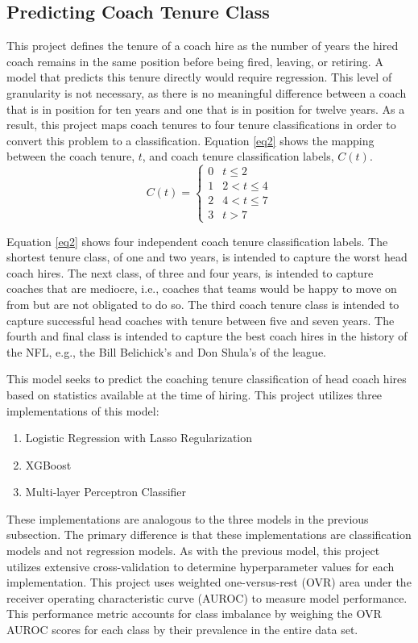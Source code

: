\documentclass[conference]{IEEEtran}
\begin{document}
\subsection{Predicting Coach Tenure Class}
This project defines the tenure of a coach hire as the number of years the hired coach remains in the same position before being fired, leaving, or retiring. A model that predicts this tenure directly would require regression. This level of granularity is not necessary, as there is no meaningful difference between a coach that is in position for ten years and one that is in position for twelve years. As a result, this project maps coach tenures to four tenure classifications in order to convert this problem to a classification. Equation \eqref{eq2} shows the mapping between the coach tenure, $t$, and coach tenure classification labels, $C(t)$.
\begin{equation}
        C(t)=
        \begin{cases}
            0 &t \leq 2 		\\
            1 &2 < t \leq 4 \\
            2 &4 < t \leq 7 \\
            3 &t > 7
        \end{cases}
        \label{eq2}
\end{equation}

Equation \eqref{eq2} shows four independent coach tenure classification labels. The shortest tenure class, of one and two years, is intended to capture the worst head coach hires. The next class, of three and four years, is intended to capture coaches that are mediocre, i.e., coaches that teams would be happy to move on from but are not obligated to do so. The third coach tenure class is intended to capture successful head coaches with tenure between five and seven years. The fourth and final class is intended to capture the best coach hires in the history of the NFL, e.g., the Bill Belichick's and Don Shula's of the league.

This model seeks to predict the coaching tenure classification of head coach hires based on statistics available at the time of hiring. This project utilizes three implementations of this model:
\begin{enumerate}
  \item Logistic Regression with Lasso Regularization\cite{b7}
  \item XGBoost\cite{b8}
  \item Multi-layer Perceptron Classifier\cite{b7}
\end{enumerate}
These implementations are analogous to the three models in the previous subsection. The primary difference is that these implementations are classification models and not regression models. As with the previous model, this project utilizes extensive cross-validation to determine hyperparameter values for each implementation. This project uses weighted one-versus-rest (OVR) area under the receiver operating characteristic curve (AUROC) to measure model performance. This performance metric accounts for class imbalance by weighing the OVR AUROC scores for each class by their prevalence in the entire data set.
\end{document}
